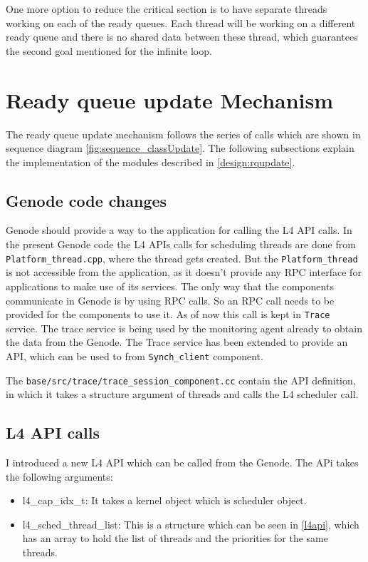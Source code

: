 One more option to reduce the critical section is to have separate threads working on each of the ready queues. Each thread will be working on a different ready queue and there is no shared data between these thread, which guarantees the second goal mentioned for the infinite loop. 
 
\section{Ready queue update Mechanism}

The ready queue update mechanism follows the series of calls which are shown in sequence diagram \ref{fig:sequence_classUpdate}. The following subsections explain the implementation of the modules described in \ref{design:rqupdate}.

\subsection{Genode code changes}

Genode should provide a way to the application for calling the L4 API calls. In the present Genode code the L4 APIs calls for scheduling threads are done from \texttt{Platform\_thread.cpp}, where the thread gets created. But the \texttt{Platform\_thread} is not accessible from the application, as it doesn't provide any RPC interface for applications to make use of its services. The only way that the components communicate in Genode is by using RPC calls. So an RPC call needs to be provided for the components to use it. As of now this call is kept in \texttt{Trace} service. The trace service is being used by the monitoring agent already to obtain the data from the Genode. The Trace service has been extended to provide an API, which can be used to from \texttt{Synch\_client} component.

The \texttt{base/src/trace/trace\_session\_component.cc} contain the API definition, in which it takes a structure argument of threads and calls the L4 scheduler call.

\subsection{L4 API calls} \label{imp:l4api}
I introduced a new L4 API which can be called from the Genode. The APi takes the following arguments:

\begin{itemize}
\item l4\_cap\_idx\_t: It takes a kernel object which is scheduler object.  

\item l4\_sched\_thread\_list: This is a structure which can be seen in \ref{l4api}, which has an array to hold the list of threads and the priorities for the same threads. 

\end{itemize}

